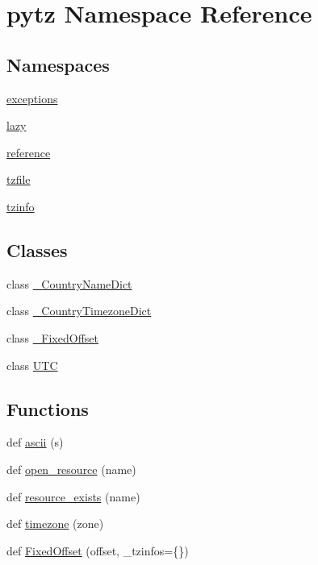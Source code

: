 \hypertarget{namespacepytz}{}\section{pytz Namespace Reference}
\label{namespacepytz}
\subsection*{Namespaces}
\begin{DoxyCompactItemize}
\item 
 \hyperlink{namespacepytz_1_1exceptions}{exceptions}
\item 
 \hyperlink{namespacepytz_1_1lazy}{lazy}
\item 
 \hyperlink{namespacepytz_1_1reference}{reference}
\item 
 \hyperlink{namespacepytz_1_1tzfile}{tzfile}
\item 
 \hyperlink{namespacepytz_1_1tzinfo}{tzinfo}
\end{DoxyCompactItemize}
\subsection*{Classes}
\begin{DoxyCompactItemize}
\item 
class \hyperlink{classpytz_1_1__CountryNameDict}{\+\_\+\+Country\+Name\+Dict}
\item 
class \hyperlink{classpytz_1_1__CountryTimezoneDict}{\+\_\+\+Country\+Timezone\+Dict}
\item 
class \hyperlink{classpytz_1_1__FixedOffset}{\+\_\+\+Fixed\+Offset}
\item 
class \hyperlink{classpytz_1_1UTC}{U\+TC}
\end{DoxyCompactItemize}
\subsection*{Functions}
\begin{DoxyCompactItemize}
\item 
def \hyperlink{namespacepytz_a3b47f581b0f7a2e44fc39a9e56941618}{ascii} (s)
\item 
def \hyperlink{namespacepytz_a902975213c079691292a54e1a341891c}{open\+\_\+resource} (name)
\item 
def \hyperlink{namespacepytz_a438c8878c1f251185ee9f2233acf6f89}{resource\+\_\+exists} (name)
\item 
def \hyperlink{namespacepytz_a864aeabe33e444f56b55e925803db0be}{timezone} (zone)
\item 
def \hyperlink{namespacepytz_af79016a547a0b7bae15ac4218644a224}{Fixed\+Offset} (offset, \+\_\+tzinfos=\{\})
\end{DoxyCompactItemize}
